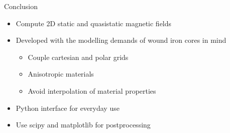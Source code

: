 %
%
%
%
%

\begin{frame}{Conclusion}
  \begin{itemize}
  \item Compute 2D static and quasistatic magnetic fields
  \item Developed with the modelling demands of wound iron cores in
    mind
    \begin{itemize}
    \item Couple cartesian and polar grids
    \item Anisotropic materials
    \item Avoid interpolation of material properties
    \end{itemize}
  \item Python interface for everyday use
  \item Use scipy and matplotlib for postprocessing
  \end{itemize}
\end{frame}

